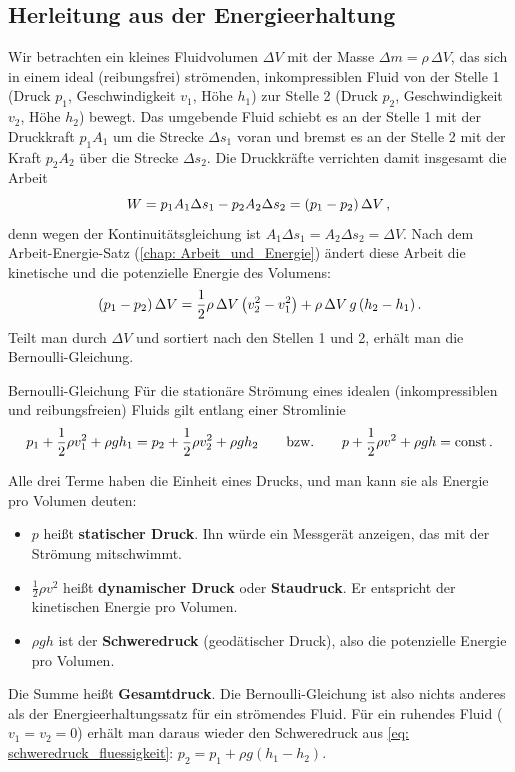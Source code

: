 \subsection{Herleitung aus der Energieerhaltung}
Wir betrachten ein kleines Fluidvolumen $\Delta V$ mit der Masse $\Delta m = \rho \, \Delta V$, das sich in einem ideal (reibungsfrei) strömenden, inkompressiblen Fluid von der Stelle 1 (Druck $p_1$, Geschwindigkeit $v_1$, Höhe $h_1$) zur Stelle 2 (Druck $p_2$, Geschwindigkeit $v_2$, Höhe $h_2$) bewegt. Das umgebende Fluid schiebt es an der Stelle 1 mit der Druckkraft $p_1 A_1$ um die Strecke $\Delta s_1$ voran und bremst es an der Stelle 2 mit der Kraft $p_2 A_2$ über die Strecke $\Delta s_2$. Die Druckkräfte verrichten damit insgesamt die Arbeit
\begin{equation*}
    W = p_1 A_1 \Delta s_1 - p_2 A_2 \Delta s_2 = (p_1 - p_2) \, \Delta V \,{,}\,
\end{equation*}
denn wegen der Kontinuitätsgleichung ist $A_1 \Delta s_1 = A_2 \Delta s_2 = \Delta V$. Nach dem Arbeit-Energie-Satz (\cref{chap: Arbeit_und_Energie}) ändert diese Arbeit die kinetische und die potenzielle Energie des Volumens:
\begin{equation*}
    (p_1 - p_2)\, \Delta V = \frac{1}{2} \rho \, \Delta V \left(v_2^2 - v_1^2\right) + \rho \, \Delta V \, g \, (h_2 - h_1) \,.
\end{equation*}
Teilt man durch $\Delta V$ und sortiert nach den Stellen 1 und 2, erhält man die Bernoulli-Gleichung.

\begin{importantbox}[]{Bernoulli-Gleichung}
    Für die stationäre Strömung eines idealen (inkompressiblen und reibungsfreien) Fluids gilt entlang einer Stromlinie
    \begin{equation}\label{eq: bernoulli}
        p_1 + \frac{1}{2}\rho v_1^2 + \rho g h_1 = p_2 + \frac{1}{2}\rho v_2^2 + \rho g h_2 \qquad \text{bzw.} \qquad p + \frac{1}{2}\rho v^2 + \rho g h = \mathrm{const} \,.
    \end{equation}
\end{importantbox}

Alle drei Terme haben die Einheit eines Drucks, und man kann sie als Energie pro Volumen deuten:
\begin{itemize}[itemsep=1.5pt]
    \item $p$ heißt \textbf{statischer Druck}. Ihn würde ein Messgerät anzeigen, das mit der Strömung mitschwimmt.
    \item $\frac{1}{2}\rho v^2$ heißt \textbf{dynamischer Druck} oder \textbf{Staudruck}. Er entspricht der kinetischen Energie pro Volumen.
    \item $\rho g h$ ist der \textbf{Schweredruck} (geodätischer Druck), also die potenzielle Energie pro Volumen.
\end{itemize}
Die Summe heißt \textbf{Gesamtdruck}. Die Bernoulli-Gleichung ist also nichts anderes als der Energieerhaltungssatz für ein strömendes Fluid. Für ein ruhendes Fluid ($v_1 = v_2 = 0$) erhält man daraus wieder den Schweredruck aus \cref{eq: schweredruck_fluessigkeit}: $p_2 = p_1 + \rho g (h_1 - h_2)$.

